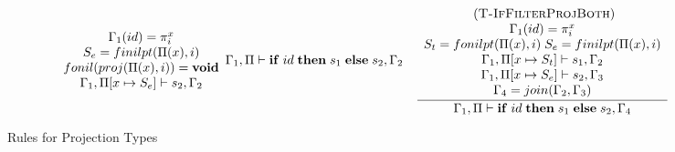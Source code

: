 \documentclass[10pt]{sigplanconf}
\newcommand{\mylabel}[1]{\; (\textsc{#1})}
\newcommand{\env}{\Gamma}
\newcommand{\penv}{\Pi}
\begin{document}
\begin{figure*}[t]
{\[\begin{array}{c}
\begin{array}{c}
{\begin{array}{c}
	\env_{1}(id) = \pi_{i}^{x} \\
	 S_e = finilpt(\Pi(x), i)\\
	fonil(proj(\Pi(x), i)) = {\bf void} \\
	\env_{1}, \penv[x \mapsto S_e] \vdash s_{2}, \env_{2} 
	\end{array}}
{\env_{1}, \penv \vdash \mathbf{if} \; id \; \mathbf{then} \; s_{1} \; \mathbf{else} \; s_{2}, \env_{2}}
\end{array}
\begin{array}{c}
\mylabel{T-IfFilterProjBoth}\\
\dfrac{\begin{array}{c}
	\env_{1}(id) = \pi_{i}^{x} \\ S_t = fonilpt(\Pi(x), i) \; S_e = finilpt(\Pi(x), i)\\
	\env_{1}, \penv[x \mapsto S_t] \vdash s_{1}, \env_{2} \\
	\env_{1}, \penv[x \mapsto S_e] \vdash s_{2}, \env_{3} \\
	\env_{4} = join(\env_{2}, \env_{3}) 
	\end{array}}
{\env_{1}, \penv \vdash \mathbf{if} \; id \; \mathbf{then} \; s_{1} \; \mathbf{else} \; s_{2}, \env_{4}}
\end{array}
\end{array}
\]}
\caption{Rules for Projection Types}
\end{figure*}
\end{document}
